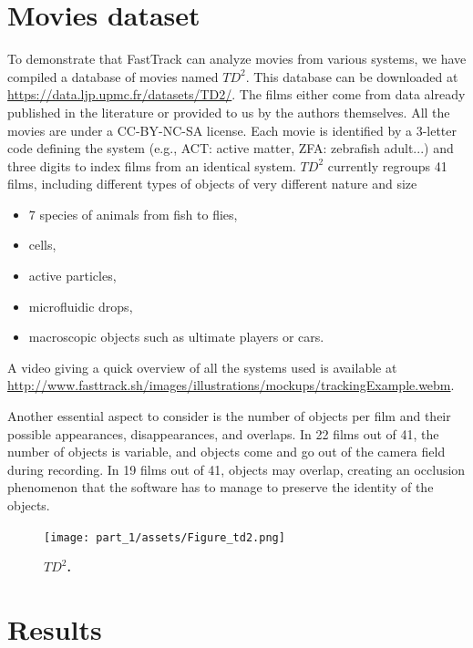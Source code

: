 \chapter{Movies dataset}
    To demonstrate that FastTrack can analyze movies from various systems, we have compiled a database of movies named $TD^2$. This database can be downloaded at \url{https://data.ljp.upmc.fr/datasets/TD2/}. The films either come from data already published in the literature or provided to us by the authors themselves. All the movies are under a CC-BY-NC-SA license. Each movie is identified by a 3-letter code defining the system (e.g., ACT: active matter, ZFA: zebrafish adult...) and three digits to index films from an identical system. $TD^2$ currently regroups 41 films, including different types of objects of very different nature and size
    \begin{itemize}
    \item 7 species of animals from fish to flies,
    \item cells,
    \item active particles,
    \item microfluidic drops,
    \item macroscopic objects such as ultimate players or cars.
    \end{itemize}
    A video giving a quick overview of all the systems used is available at \url{http://www.fasttrack.sh/images/illustrations/mockups/trackingExample.webm}.

    Another essential aspect to consider is the number of objects per film and their possible appearances, disappearances, and overlaps. In 22 films out of 41, the number of objects is variable, and objects come and go out of the camera field during recording. In 19 films out of 41, objects may overlap, creating an occlusion phenomenon that the software has to manage to preserve the identity of the objects.

	\begin{figure}[h!]
    \centering
    \texttt{[image: part\_1/assets/Figure\_td2.png]}    
    \caption{\textbf{$TD^2$.}}
    \label{part_1:fig_5}
    \end{figure}


\chapter{Results}

